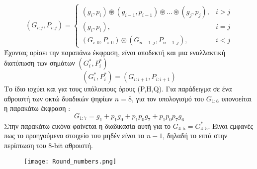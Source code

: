 \begin{equation}
    (G_{i:j},P_{i:j}) =
    \begin{cases}
        (g_i,p_i)\circledast(g_{i-1},p_{i-1})\circledast...\circledast(g_j,p_j) ,& i > j \\
        (g_i,p_i) ,& i = j \\
        (G_{i:0},P_{i:0}) \circledast (G_{n-1:j},P_{n-1:j}) ,& i < j
    \end{cases}
\end{equation}
Έχοντας ορίσει την παραπάνω έκφραση, είναι αποδεκτή και μια εναλλακτική διατύπωση των σημάτων $(G^*_i,P^*_i)$
\begin{equation}
    (G^*_i,P^*_i) = (G_{i:i+1},P_{i:i+1})
\end{equation}
Το ίδιο ισχύει και για τους υπόλοιπους όρους (P,H,Q).
Για παράδειγμα σε ένα αθροιστή των οκτώ δυαδικών ψηφίων $n=8$, για τον υπολογισμό του 
$G_{1:6}$ υπονοείται η παρακάτω έκφραση :
\begin{equation*}
    G_{1:7} = g_1 + p_1g_0 + p_1p_0g_7 + p_1p_0p_7g_6
\end{equation*}
Στην παρακάτω εικόνα φαίνεται η διαδικασία αυτή για το $G_{4:5} = G^*_{4:5}$. Είναι εμφανές
πως το προηγούμενο στοιχείο του μηδέν είναι το $n-1$, δηλαδή το επτά στην περίπτωση του 8-bit
αθροιστή. 
\begin{figure}[H]
\centering
\texttt{[image: Round\_numbers.png]}
\end{figure}






